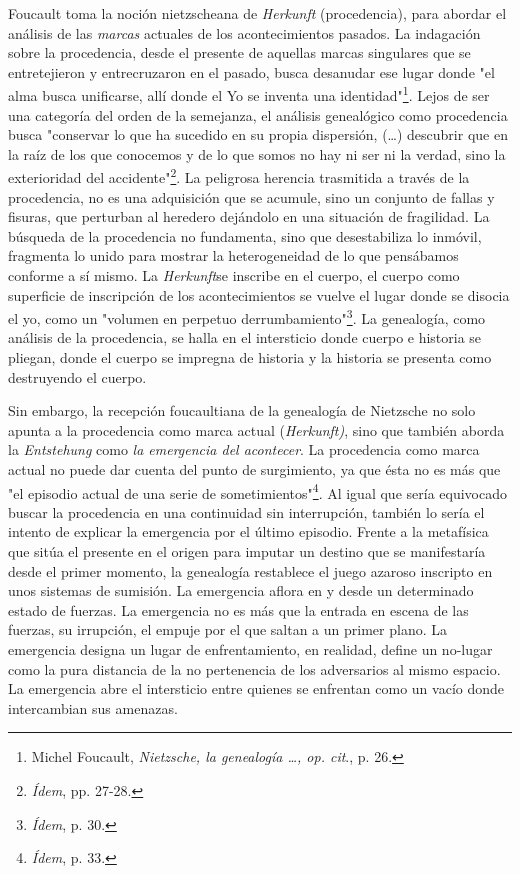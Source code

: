Foucault toma la noción nietzscheana de \emph{Herkunft} (procedencia),
para abordar el análisis de las \emph{marcas} actuales de los
acontecimientos pasados. La indagación sobre la procedencia, desde el
presente de aquellas marcas singulares que se entretejieron y
entrecruzaron en el pasado, busca desanudar ese lugar donde "el alma
busca unificarse, allí donde el Yo se inventa una identidad"\footnote{Michel
  Foucault, \emph{Nietzsche, la genealogía \ldots, op. cit}., p. 26.}.
Lejos de ser una categoría del orden de la semejanza, el análisis
genealógico como procedencia busca "conservar lo que ha sucedido en su
propia dispersión, (\dots) descubrir que en la raíz de los que
conocemos y de lo que somos no hay ni ser ni la verdad, sino la
exterioridad del accidente"\footnote{\emph{Ídem}, pp. 27-28.}. La
peligrosa herencia trasmitida a través de la procedencia, no es una
adquisición que se acumule, sino un conjunto de fallas y fisuras, que
perturban al heredero dejándolo en una situación de fragilidad. La
búsqueda de la procedencia no fundamenta, sino que desestabiliza lo
inmóvil, fragmenta lo unido para mostrar la heterogeneidad de lo que
pensábamos conforme a sí mismo. La \emph{Herkunft}se inscribe en el
cuerpo, el cuerpo como superficie de inscripción de los acontecimientos
se vuelve el lugar donde se disocia el yo, como un "volumen en perpetuo
derrumbamiento"\footnote{\emph{Ídem}, p. 30.}. La genealogía, como
análisis de la procedencia, se halla en el intersticio donde cuerpo e
historia se pliegan, donde el cuerpo se impregna de historia y la
historia se presenta como destruyendo el cuerpo.

Sin embargo, la recepción foucaultiana de la genealogía de Nietzsche no
solo apunta a la procedencia como marca actual (\emph{Herkunft)}, sino
que también aborda la \emph{Entstehung} como \emph{la emergencia del
acontecer}. La procedencia como marca actual no puede dar cuenta del
punto de surgimiento, ya que ésta no es más que "el episodio actual de
una serie de sometimientos"\footnote{\emph{Ídem}, p. 33.}. Al igual que
sería equivocado buscar la procedencia en una continuidad sin
interrupción, también lo sería el intento de explicar la emergencia por
el último episodio. Frente a la metafísica que sitúa el presente en el
origen para imputar un destino que se manifestaría desde el primer
momento, la genealogía restablece el juego azaroso inscripto en unos
sistemas de sumisión. La emergencia aflora en y desde un determinado
estado de fuerzas. La emergencia no es más que la entrada en escena de
las fuerzas, su irrupción, el empuje por el que saltan a un primer
plano. La emergencia designa un lugar de enfrentamiento, en realidad,
define un no-lugar como la pura distancia de la no pertenencia de los
adversarios al mismo espacio. La emergencia abre el intersticio entre
quienes se enfrentan como un vacío donde intercambian sus amenazas.

